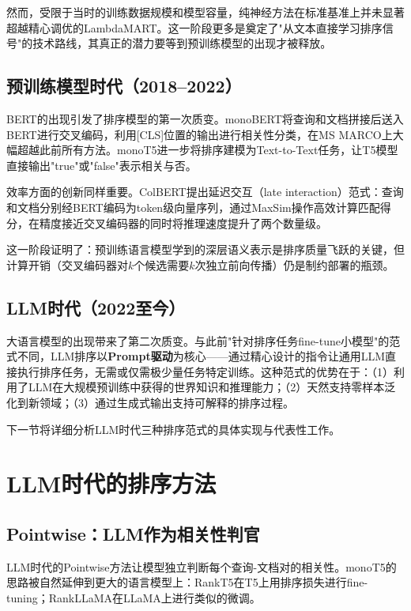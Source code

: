\documentclass[12pt,a4paper]{article}
\begin{document}
然而，受限于当时的训练数据规模和模型容量，纯神经方法在标准基准上并未显著超越精心调优的LambdaMART。这一阶段更多是奠定了"从文本直接学习排序信号"的技术路线，其真正的潜力要等到预训练模型的出现才被释放。

\subsection{预训练模型时代（2018--2022）}

BERT\cite{devlin2019bert}的出现引发了排序模型的第一次质变。monoBERT\cite{nogueira2019passage}将查询和文档拼接后送入BERT进行交叉编码，利用[CLS]位置的输出进行相关性分类，在MS MARCO\cite{nguyen2016ms}上大幅超越此前所有方法。monoT5\cite{nogueira2020document}进一步将排序建模为Text-to-Text任务，让T5模型直接输出"true"或"false"表示相关与否。

效率方面的创新同样重要。ColBERT\cite{khattab2020colbert}提出延迟交互（late interaction）范式：查询和文档分别经BERT编码为token级向量序列，通过MaxSim操作高效计算匹配得分，在精度接近交叉编码器的同时将推理速度提升了两个数量级。

这一阶段证明了：预训练语言模型学到的深层语义表示是排序质量飞跃的关键，但计算开销（交叉编码器对$k$个候选需要$k$次独立前向传播）仍是制约部署的瓶颈。

\subsection{LLM时代（2022至今）}

大语言模型的出现带来了第二次质变。与此前"针对排序任务fine-tune小模型"的范式不同，LLM排序以\textbf{Prompt驱动}为核心——通过精心设计的指令让通用LLM直接执行排序任务，无需或仅需极少量任务特定训练。这种范式的优势在于：（1）利用了LLM在大规模预训练中获得的世界知识和推理能力；（2）天然支持零样本泛化到新领域；（3）通过生成式输出支持可解释的排序过程。

下一节将详细分析LLM时代三种排序范式的具体实现与代表性工作。

\section{LLM时代的排序方法}

\subsection{Pointwise：LLM作为相关性判官}

LLM时代的Pointwise方法让模型独立判断每个查询-文档对的相关性。monoT5\cite{nogueira2020document}的思路被自然延伸到更大的语言模型上：RankT5\cite{zhuang2023rankt5}在T5上用排序损失进行fine-tuning；RankLLaMA\cite{ma2024fine}在LLaMA上进行类似的微调。
\end{document}

